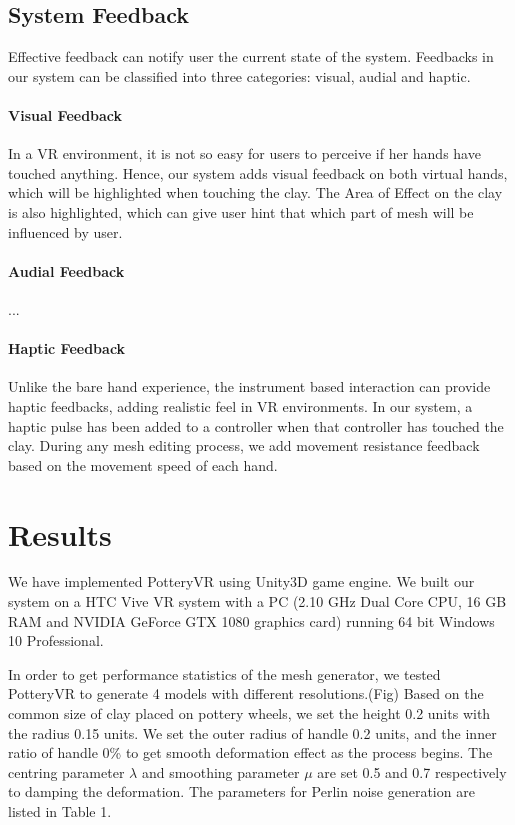 \subsection{System Feedback}
\label{sec:4.4}
Effective feedback can notify user the current state of the system. Feedbacks in our system can be classified into three categories: visual, audial and haptic.

\paragraph{Visual Feedback}
In a VR environment, it is not so easy for users to perceive if her hands have touched anything. Hence, our system adds visual feedback on both virtual hands, which will be highlighted when touching the clay. The Area of Effect on the clay is also highlighted, which can give user hint that which part of mesh will be influenced by user.

\paragraph{Audial Feedback}
...



\paragraph{Haptic Feedback}
Unlike the bare hand experience, the instrument based interaction can provide haptic feedbacks, adding realistic feel in VR environments. In our system, a haptic pulse has been added to a controller when that controller has touched the clay. During any mesh editing process, we add movement resistance feedback based on the movement speed of each hand.

\section{Results}
\label{sec:5}
We have implemented PotteryVR using Unity3D\cite{website:unity} game engine. We built our system on a HTC Vive\cite{website:vive} VR system with a PC (2.10 GHz Dual Core CPU, 16 GB RAM and NVIDIA GeForce GTX 1080 graphics card) running 64 bit Windows 10 Professional.

In order to get performance statistics of the mesh generator, we tested PotteryVR to generate 4 models with different resolutions.(Fig) 
Based on the common size of clay placed on pottery wheels, we set the height 0.2 units with the radius 0.15 units.
We set the outer radius of handle 0.2 units, and the inner ratio of handle 0\% to get smooth deformation effect as the process begins. The centring parameter $\lambda$ and smoothing parameter $\mu$ are set 0.5 and 0.7 respectively to damping the deformation. The parameters for Perlin noise generation are listed in Table 1.

